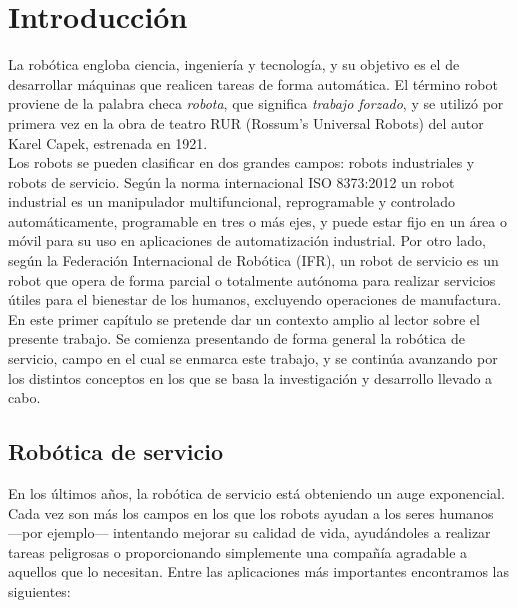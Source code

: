 \chapter{Introducción}
\label{cap:capitulo1}
\setcounter{page}{1}

La robótica engloba ciencia, ingeniería y tecnología, y su objetivo es el de desarrollar máquinas que realicen tareas de forma automática. El término robot proviene de la palabra checa \textit{robota}, que significa \textit{trabajo forzado}, y se utilizó por primera vez en la obra de teatro RUR (Rossum's Universal Robots) del autor Karel Capek, estrenada en 1921.\\

Los robots se pueden clasificar en dos grandes campos: robots industriales y robots de servicio. Según la norma internacional ISO 8373:2012 un robot industrial es un manipulador multifuncional, reprogramable y controlado automáticamente, programable en tres o más ejes, y puede estar fijo en un área o móvil para su uso en aplicaciones de automatización industrial. Por otro lado, según la Federación Internacional de Robótica (IFR), un robot de servicio es un robot que opera de forma parcial o totalmente autónoma para realizar servicios útiles para el bienestar de los humanos, excluyendo operaciones de manufactura.\\

En este primer capítulo se pretende dar un contexto amplio al lector sobre el presente trabajo. Se comienza presentando de forma general la robótica de servicio, campo en el cual se enmarca este trabajo, y se continúa avanzando por los distintos conceptos en los que se basa la investigación y desarrollo llevado a cabo.

\section{Robótica de servicio}
\label{sec:robotica} %

En los últimos años, la robótica de servicio está obteniendo un auge exponencial. Cada vez son más los campos en los que los robots ayudan a los seres humanos ---por ejemplo--- intentando mejorar su calidad de vida, ayudándoles a realizar tareas peligrosas o proporcionando simplemente una compañía agradable a aquellos que lo necesitan. Entre las aplicaciones más importantes encontramos las siguientes:

